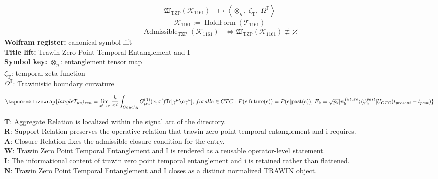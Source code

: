 \noindent
\begin{minipage}[t]{0.48\linewidth}
\begingroup
\small
\[
\begin{aligned}
\mathfrak{W}_{\mathrm{TZP}}\!\left(\mathcal{K}_{1161}\right)
&\longmapsto
\left\langle \otimes_{\eta},\; \zeta_{\mathrm{T}},\; \Omega^{\mathbb{T}} \right\rangle
\end{aligned}
\]
\[
\mathcal{K}_{1161}
:=
\operatorname{HoldForm}\!\left(\mathcal{T}_{1161}\right)
\]
\[
\begin{aligned}
\operatorname{Admissible}_{\mathrm{TZP}}\!\left(\mathcal{K}_{1161}\right)
&\Longleftrightarrow
\mathfrak{W}_{\mathrm{TZP}}\!\left(\mathcal{K}_{1161}\right)\not\equiv\varnothing
\end{aligned}
\]
\textbf{Wolfram register:} canonical symbol lift\\
\textbf{Title lift:} Trawin Zero Point Temporal Entanglement and I\\
\textbf{Symbol key:} \(\otimes_{\eta}\): entanglement tensor map\\ \(\zeta_{\mathrm{T}}\): temporal zeta function\\ \(\Omega^{\mathbb{T}}\): Trawinistic boundary curvature
\par
\endgroup
\end{minipage}\hfill
\begin{minipage}[t]{0.48\linewidth}
\[
\tzpnormalizewrap{langle T_{\mu u} \rangle_{ren} = \lim_{x' \to x} \frac{\hbar}{\pi^2} \int_{Cauchy} G_{\mu u}^{(1)}(x, x') \text{Tr}[\gamma^\mu \o\gamma^ u],\,forall e \in CTC : P(e | \text{future}(e)) = P(e | \text{past}(e)),\,E_{\mathrm{k}} = \sqrt{p_{\mathrm{k}}} \lvert \psi_{\mathrm{k}}^{future} \rangle \langle \psi_{\mathrm{k}}^{past}| U_{CTC}(t_{present} - t_{past})}
\]

\small
\textbf{T}: Aggregate Relation is localized within the signal arc of the directory.\\
\textbf{R}: Support Relation preserves the operative relation that trawin zero point temporal entanglement and i requires.\\
\textbf{A}: Closure Relation fixes the admissible closure condition for the entry.\\
\textbf{W}: Trawin Zero Point Temporal Entanglement and I is rendered as a reusable operator-level statement.\\
\textbf{I}: The informational content of trawin zero point temporal entanglement and i is retained rather than flattened.\\
\textbf{N}: Trawin Zero Point Temporal Entanglement and I closes as a distinct normalized TRAWIN object.
\normalsize
\end{minipage}

